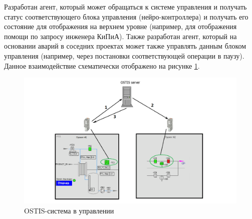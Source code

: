 Разработан агент, который может обращаться к системе управления и получать статус соответствующего блока управления (нейро-контроллера) и получать его состояние для отображения на верхнем уровне (например, для отображения помощи по запросу инженера КиПиА). Также разработан агент, который на основании аварий в соседних проектах может также управлять данным блоком управления (например, через постановки соответствующей операции в паузу). Данное взаимодействие схематически отображено на рисунке \ref{fig:OSTIS_in_control}.

\begin{figure}[H]
    \centering
    \includegraphics[width=\textwidth,height=\textheight,keepaspectratio]{images/chapter_4/OSTIS_in_control.png}
    \caption{OSTIS-система в управлении}
    \label{fig:OSTIS_in_control}
\end{figure}
